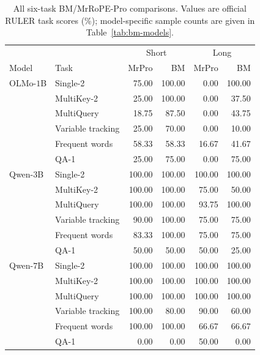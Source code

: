 \begin{table}[ht]
\centering\small
\caption{All six-task BM/MrRoPE-Pro comparisons. Values are official RULER task scores (\%); model-specific sample counts are given in Table~\ref{tab:bm-models}.}
\label{tab:bm-full-tasks}
\begin{tabular}{@{}llrrrr@{}}
\toprule
& & \multicolumn{2}{c}{Short} & \multicolumn{2}{c}{Long}\\
Model & Task & MrPro & BM & MrPro & BM\\
\midrule
OLMo-$1$B & Single-2 & 75.00 & 100.00 & 0.00 & 100.00 \\
 & MultiKey-2 & 25.00 & 100.00 & 0.00 & 37.50 \\
 & MultiQuery & 18.75 & 87.50 & 0.00 & 43.75 \\
 & Variable tracking & 25.00 & 70.00 & 0.00 & 10.00 \\
 & Frequent words & 58.33 & 58.33 & 16.67 & 41.67 \\
 & QA-1 & 25.00 & 75.00 & 0.00 & 75.00 \\
\midrule
Qwen-$3$B & Single-2 & 100.00 & 100.00 & 100.00 & 100.00 \\
 & MultiKey-2 & 100.00 & 100.00 & 75.00 & 50.00 \\
 & MultiQuery & 100.00 & 100.00 & 93.75 & 100.00 \\
 & Variable tracking & 90.00 & 100.00 & 75.00 & 75.00 \\
 & Frequent words & 83.33 & 100.00 & 75.00 & 75.00 \\
 & QA-1 & 50.00 & 50.00 & 50.00 & 25.00 \\
\midrule
Qwen-$7$B & Single-2 & 100.00 & 100.00 & 100.00 & 100.00 \\
 & MultiKey-2 & 100.00 & 100.00 & 100.00 & 100.00 \\
 & MultiQuery & 100.00 & 100.00 & 100.00 & 100.00 \\
 & Variable tracking & 100.00 & 80.00 & 90.00 & 60.00 \\
 & Frequent words & 100.00 & 100.00 & 66.67 & 66.67 \\
 & QA-1 & 0.00 & 0.00 & 50.00 & 0.00 \\
\bottomrule
\end{tabular}
\end{table}
